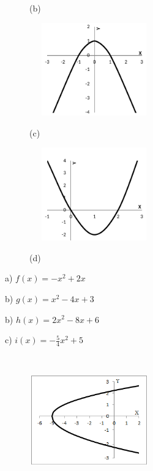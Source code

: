 \begin{enumerate}[label=\thechapter.\arabic*]
\begin{multicols}{2}
\begin{figure}[H]
        (b)
\end{figure}

\begin{figure}[H]
        \includegraphics[width=2.2in,height=1.58in]{capitulos/funcao_do_segundo_grau/media/image40.pdf}
        
        (c)
\end{figure}

\begin{figure}[H]
        \includegraphics[width=2.2in,height=1.58in]{capitulos/funcao_do_segundo_grau/media/image41.pdf}
        
        (d)
\end{figure}
\end{multicols}

\ansitem{} a) \( f \left( x \right) =-x^{2}+2x \)

    b)  \( g \left( x \right) =x^{2}-4x+3 \) 

	b) \( h \left( x \right) = 2x^{2}-8x+6 \) 

	c) \( i \left( x \right) =-\frac{5}{4}x^{2}+5 \)

\ansitem{} ~

\begin{multicols}{2}
\begin{figure}[H]
        \includegraphics[width=2.05in,height=1.55in]{capitulos/funcao_do_segundo_grau/media/image42.png}
        

\end{figure}
\end{multicols}
\end{enumerate}
